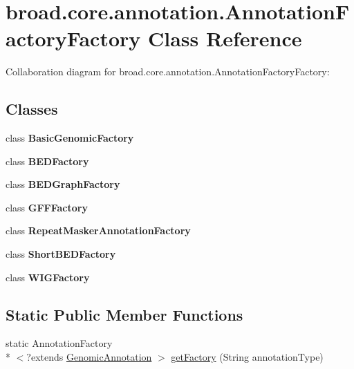 \hypertarget{classbroad_1_1core_1_1annotation_1_1_annotation_factory_factory}{\section{broad.\+core.\+annotation.\+Annotation\+Factory\+Factory Class Reference}
\label{classbroad_1_1core_1_1annotation_1_1_annotation_factory_factory}
}


Collaboration diagram for broad.\+core.\+annotation.\+Annotation\+Factory\+Factory\+:
\subsection*{Classes}
\begin{DoxyCompactItemize}
\item 
class {\bfseries Basic\+Genomic\+Factory}
\item 
class {\bfseries B\+E\+D\+Factory}
\item 
class {\bfseries B\+E\+D\+Graph\+Factory}
\item 
class {\bfseries G\+F\+F\+Factory}
\item 
class {\bfseries Repeat\+Masker\+Annotation\+Factory}
\item 
class {\bfseries Short\+B\+E\+D\+Factory}
\item 
class {\bfseries W\+I\+G\+Factory}
\end{DoxyCompactItemize}
\subsection*{Static Public Member Functions}
\begin{DoxyCompactItemize}
\item 
static Annotation\+Factory\\*
$<$?extends \hyperlink{interfacebroad_1_1core_1_1annotation_1_1_genomic_annotation}{Genomic\+Annotation} $>$ \hyperlink{classbroad_1_1core_1_1annotation_1_1_annotation_factory_factory_aef96a679b4e6771e8990e90dc5694e2f}{get\+Factory} (String annotation\+Type)
\end{DoxyCompactItemize}
